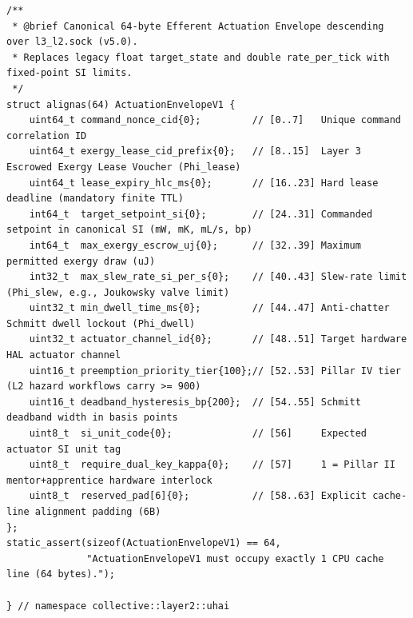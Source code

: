 \begin{lstlisting}
/**
 * @brief Canonical 64-byte Efferent Actuation Envelope descending over l3_l2.sock (v5.0).
 * Replaces legacy float target_state and double rate_per_tick with fixed-point SI limits.
 */
struct alignas(64) ActuationEnvelopeV1 {
    uint64_t command_nonce_cid{0};         // [0..7]   Unique command correlation ID
    uint64_t exergy_lease_cid_prefix{0};   // [8..15]  Layer 3 Escrowed Exergy Lease Voucher (Phi_lease)
    uint64_t lease_expiry_hlc_ms{0};       // [16..23] Hard lease deadline (mandatory finite TTL)
    int64_t  target_setpoint_si{0};        // [24..31] Commanded setpoint in canonical SI (mW, mK, mL/s, bp)
    int64_t  max_exergy_escrow_uj{0};      // [32..39] Maximum permitted exergy draw (uJ)
    int32_t  max_slew_rate_si_per_s{0};    // [40..43] Slew-rate limit (Phi_slew, e.g., Joukowsky valve limit)
    uint32_t min_dwell_time_ms{0};         // [44..47] Anti-chatter Schmitt dwell lockout (Phi_dwell)
    uint32_t actuator_channel_id{0};       // [48..51] Target hardware HAL actuator channel
    uint16_t preemption_priority_tier{100};// [52..53] Pillar IV tier (L2 hazard workflows carry >= 900)
    uint16_t deadband_hysteresis_bp{200};  // [54..55] Schmitt deadband width in basis points
    uint8_t  si_unit_code{0};              // [56]     Expected actuator SI unit tag
    uint8_t  require_dual_key_kappa{0};    // [57]     1 = Pillar II mentor+apprentice hardware interlock
    uint8_t  reserved_pad[6]{0};           // [58..63] Explicit cache-line alignment padding (6B)
};
static_assert(sizeof(ActuationEnvelopeV1) == 64,
              "ActuationEnvelopeV1 must occupy exactly 1 CPU cache line (64 bytes).");

} // namespace collective::layer2::uhai
\end{lstlisting}
